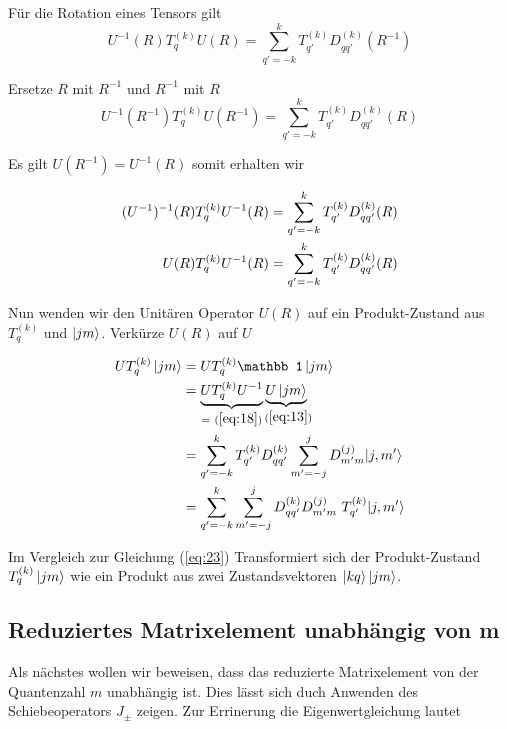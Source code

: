Für die Rotation eines Tensors gilt
\begin{equation}
  \label{eq:16}
  U^{-1}(R) T^{(k)}_q U(R) = \sum_{q'=-k}^{k}T^{(k)}_{q'} D^{(k)}_{qq'}(R^{-1}) 
\end{equation}

Ersetze \(R\) mit \(R^{-1}\) und \(R^{-1}\) mit \(R\)
\begin{equation}
  \label{eq:17}
  U^{-1}(R^{-1}) T^{(k)}_q U(R^{-1}) = \sum_{q'=-k}^{k}T^{(k)}_{q'} D^{(k)}_{qq'}(R)
\end{equation}

Es gilt \(U(R^{-1})=U^{-1}(R)\) somit erhalten wir

\begin{align}
  \label{eq:18}
  (U^{-1})^{-1}(R) T^{(k)}_q U^{-1}(R) &= \sum_{q'=-k}^{k}T^{(k)}_{q'} D^{(k)}_{qq'}(R) \notag\\
U(R) T^{(k)}_q U^{-1}(R) &= \sum_{q'=-k}^{k}T^{(k)}_{q'} D^{(k)}_{qq'}(R)
\end{align}

Nun wenden wir den Unitären Operator \(U(R)\) auf ein Produkt-Zustand aus \(T^{(k)}_q\) und \(\left| jm \right\rangle\). Verkürze \(U(R)\) auf \(U\)

\begin{align}
  \label{eq:19}
  U T^{(k)}_q\ket{jm} &= U T^{(k)}_q\mathbb 1 \ket{jm} \notag\\
&=\underbr{ U T^{(k)}_q U^{-1}}_{=~(\ref{eq:18})} \underbr{ U \ket{jm}}_{~(\ref{eq:13})}\notag \\
&= \sum_{q'=-k}^{k}T^{(k)}_{q'} D^{(k)}_{qq'} \sum_{m'=-j}^j D^{(j)}_{m'm} |j,m'\rangle \notag \\
&= \sum_{q'=-k}^{k}\sum_{m'=-j}^j D^{(k)}_{qq'}  D^{(j)}_{m'm}\,\, T^{(k)}_{q'} |j,m'\rangle  
\end{align}

Im Vergleich zur Gleichung (\ref{eq:23}) Transformiert sich der Produkt-Zustand \( T^{(k)}_q\left| jm \right\rangle\) wie ein Produkt aus zwei Zustandsvektoren \(\left| kq \right\rangle\left| jm \right\rangle\). 



\subsection*{Reduziertes Matrixelement unabhängig von m}
\label{sec:2}

Als nächstes wollen wir beweisen, dass das reduzierte Matrixelement von der Quantenzahl \(m\) unabhängig ist. Dies lässt sich duch Anwenden des Schiebeoperators \(J_{\pm}\) zeigen. Zur Errinerung die Eigenwertgleichung lautet

